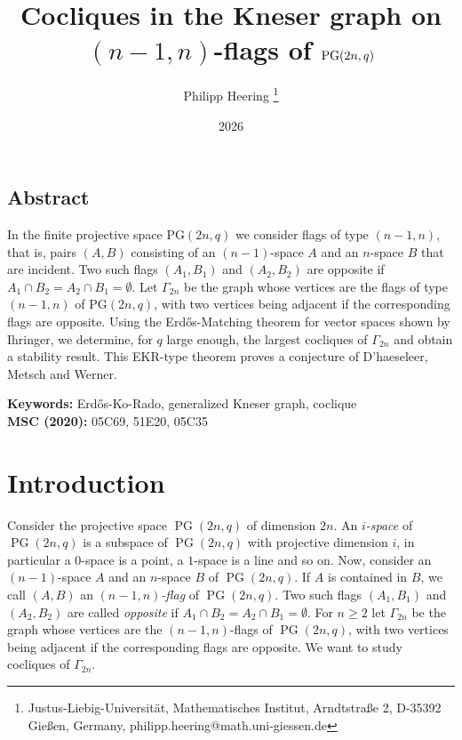 \documentclass[11pt, oneside, a4paper]{article}
\title{Cocliques in the Kneser graph on $(n-1,n)$-flags of $\PG(2n,q)$ }
\author{Philipp Heering 
\footnote{Justus-Liebig-Universität, Mathematisches Institut, Arndtstraße 2, D-35392 Gießen, Germany, philipp.heering@math.uni-giessen.de } }
\date{2026}
\DeclareMathOperator{\PG}{PG}
\begin{document}
\maketitle


\begin{center}
\subsection*{Abstract}
\end{center}

In the finite projective space PG$(2n,q)$ we consider flags of type $(n-1,n)$, that is, pairs $(A,B)$ consisting of an $(n-1)$-space $A$ and an $n$-space $B$ that are incident. Two such flags $(A_1,B_1)$ and $(A_2,B_2)$ are opposite if $A_1\cap B_2=A_2\cap B_1=\emptyset$. 
Let $\Gamma_{2n}$ be the graph whose vertices are the flags of type $(n-1,n)$ of PG$(2n,q)$, with two vertices being adjacent if the corresponding flags are opposite.
Using the Erd\H{o}s-Matching theorem for vector spaces shown by Ihringer, we determine, for $q$ large enough, the largest cocliques of $\Gamma_{2n}$ and obtain a stability result.
This EKR-type theorem 
proves a conjecture of D'haeseleer, Metsch and Werner. 

\textbf{Keywords:}  Erd\H{o}s-Ko-Rado, generalized Kneser graph, coclique\\
 \textbf{MSC (2020):} 
 05C69, %
 51E20, %
 05C35 %

\section{Introduction}



Consider the projective space $\PG(2n,q)$ of dimension $2n$. An \emph{$i$-space} of $\PG(2n,q)$ is a subspace of $\PG(2n,q)$ with projective dimension $i$, in particular a $0$-space is a point, a $1$-space is a line and so on. Now, consider an $(n-1)$-space $A$ and an $n$-space $B$ of $\PG(2n,q)$. If $A$ is contained in $B$, we call $(A,B)$ an \emph{$(n-1,n)$-flag} of $\PG(2n,q)$. Two such flags $(A_1,B_1)$ and $(A_2,B_2)$ are called \emph{opposite} if $A_1\cap B_2=A_2\cap B_1=\emptyset$. For $n\geq 2$ let $\Gamma_{2n}$ be the graph whose vertices are the $(n-1,n)$-flags of $\PG(2n,q)$, with two vertices being adjacent if the corresponding flags are opposite.
We want to study cocliques of $\Gamma_{2n}$.
\end{document}

